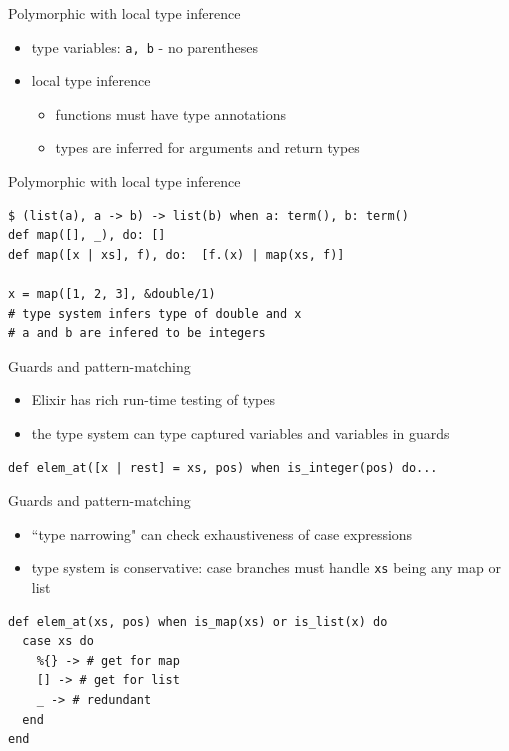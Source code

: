 \documentclass[
  ignorenonframetext,
  aspectratio=169]{beamer}
\newcommand{\passthrough}[1]{#1}
\providecommand{\tightlist}{%
  \setlength{\itemsep}{0pt}\setlength{\parskip}{0pt}}
\begin{document}
\begin{frame}[fragile]{Polymorphic with local type inference}
\label{polymorphic-with-local-type-inference}
\begin{itemize}
\tightlist
\item
  type variables: \passthrough{\lstinline!a, b!} - no parentheses
\item
  local type inference

  \begin{itemize}
  \tightlist
  \item
    functions must have type annotations
  \item
    types are inferred for arguments and return types
  \end{itemize}
\end{itemize}
\end{frame}

\begin{frame}[fragile]{Polymorphic with local type inference}
\label{polymorphic-with-local-type-inference-1}
\begin{lstlisting}
$ (list(a), a -> b) -> list(b) when a: term(), b: term()
def map([], _), do: []
def map([x | xs], f), do:  [f.(x) | map(xs, f)]

x = map([1, 2, 3], &double/1)
# type system infers type of double and x
# a and b are infered to be integers
\end{lstlisting}
\end{frame}

\begin{frame}[fragile]{Guards and pattern-matching}
\label{guards-and-pattern-matching}
\begin{itemize}
\tightlist
\item
  Elixir has rich run-time testing of types
\item
  the type system can type captured variables and variables in guards
\end{itemize}

\begin{lstlisting}
def elem_at([x | rest] = xs, pos) when is_integer(pos) do...
\end{lstlisting}
\end{frame}

\begin{frame}[fragile]{Guards and pattern-matching}
\label{guards-and-pattern-matching-1}
\begin{itemize}
\tightlist
\item
  ``type narrowing" can check exhaustiveness of case expressions
\item
  type system is conservative: case branches must handle
  \passthrough{\lstinline!xs!} being any map or list
\end{itemize}

\begin{lstlisting}
def elem_at(xs, pos) when is_map(xs) or is_list(x) do
  case xs do
    %{} -> # get for map
    [] -> # get for list
    _ -> # redundant
  end
end
\end{lstlisting}
\end{frame}
\end{document}
